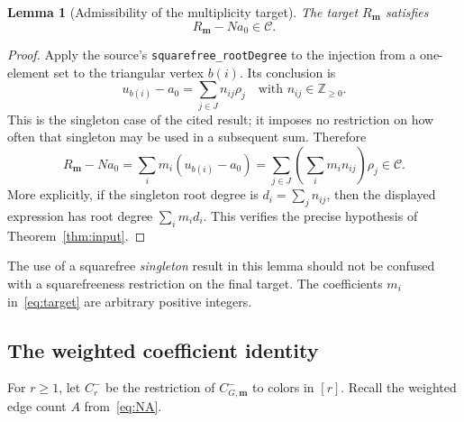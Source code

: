 \documentclass[11pt,reqno]{amsart}
\newcommand{\NN}{\mathbb Z_{\geq0}}
\newcommand{\mm}{\mathbf m}
\newcommand{\CC}{\mathscr C}
\newcommand{\decl}[1]{\nolinkurl{#1}}
\newtheorem{lemma}[theorem]{Lemma}
\theoremstyle{definition}
\theoremstyle{remark}
\numberwithin{equation}{section}
\begin{document}
\begin{lemma}[Admissibility of the multiplicity target]\label{lem:cone}
The target $R_{\mm}$ satisfies
\begin{equation}\label{eq:cone}
 R_{\mm}-Na_0\in\CC.
\end{equation}
\end{lemma}
\begin{proof}
Apply the source's \decl{squarefree_rootDegree} to the injection from
a one-element set to the triangular vertex $b(i)$.  Its conclusion is
\[
 u_{b(i)}-a_0=\sum_{j\in J}n_{ij}\rho_j
 \quad\text{with }n_{ij}\in\NN.
\]
This is the singleton case of the cited result; it imposes no
restriction on how often that singleton may be used in a subsequent
sum.  Therefore
\[
 R_{\mm}-Na_0
  =\sum_i m_i(u_{b(i)}-a_0)
  =\sum_{j\in J}\left(\sum_i m_i n_{ij}\right)\rho_j\in\CC.
\]
More explicitly, if the singleton root degree is $d_i=\sum_j n_{ij}$,
then the displayed expression has root degree $\sum_i m_i d_i$.
This verifies the precise hypothesis of Theorem~\ref{thm:input}.
\end{proof}

The use of a squarefree \emph{singleton} result in this lemma should
not be confused with a squarefreeness restriction on the final target.
The coefficients $m_i$ in~\eqref{eq:target} are arbitrary positive
integers.

\subsection{The weighted coefficient identity}
For $r\geq1$, let $C^-_r$ be the restriction of $C^-_{G,\mm}$ to
colors in $[r]$.  Recall the weighted edge count $A$ from~\eqref{eq:NA}.
\end{document}
